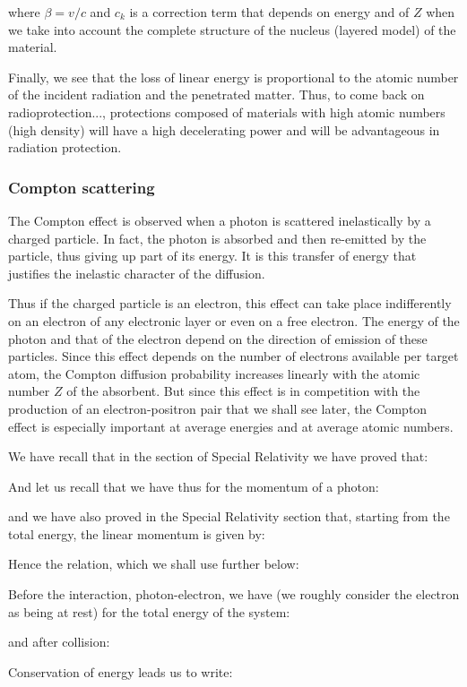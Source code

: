 	where $\beta=v/c$ and $c_k$ is a correction term that depends on energy and of $Z$ when we take into account the complete structure of the nucleus (layered model) of the material.

	Finally, we see that the loss of linear energy is proportional to the atomic number of the incident radiation and the penetrated matter. Thus, to come back on radioprotection..., protections composed of materials with high atomic numbers (high density) will have a high decelerating power and will be advantageous in radiation protection.
	
	\subsubsection{Compton scattering}
	The Compton effect is observed when a photon is scattered inelastically by a charged particle. In fact, the photon is absorbed and then re-emitted by the particle, thus giving up part of its energy. It is this transfer of energy that justifies the inelastic character of the diffusion.

	Thus if the charged particle is an electron, this effect can take place indifferently on an electron of any electronic layer or even on a free electron. The energy of the photon and that of the electron depend on the direction of emission of these particles. Since this effect depends on the number of electrons available per target atom, the Compton diffusion probability increases linearly with the atomic number $Z$ of the absorbent. But since this effect is in competition with the production of an electron-positron pair that we shall see later, the Compton effect is especially important at average energies and at average atomic numbers.

	We have recall that in the section of Special Relativity we have proved that:
	
	And let us recall that we have thus for the momentum of a photon:
	
	and we have also proved in the Special Relativity section that, starting from the total energy, the linear momentum is given by:
	
	Hence the relation, which we shall use further below:
	
	Before the interaction, photon-electron, we have (we roughly consider the electron as being at rest) for the total energy of the system:
	
	and after collision:
	
	Conservation of energy leads us to write:
	
